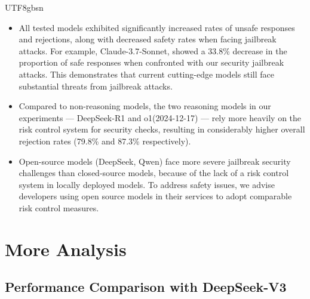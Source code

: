 \documentclass[11pt, a4paper, logo, copyright, nonumbering]{deepseek}
\begin{document}
\begin{CJK*}{UTF8}{gbsn}
\begin{itemize}
    \item All tested models exhibited significantly increased rates of unsafe responses and rejections, along with decreased safety rates when facing jailbreak attacks. For example, Claude-3.7-Sonnet, showed a 33.8\% decrease in the proportion of safe responses when confronted with our security jailbreak attacks. This demonstrates that current cutting-edge models still face substantial threats from jailbreak attacks.
    \item Compared to non-reasoning models, the two reasoning models in our experiments — DeepSeek-R1 and o1(2024-12-17) — rely more heavily on the risk control system for security checks, resulting in considerably higher overall rejection rates (79.8\% and 87.3\% respectively). 
    \item Open-source models (DeepSeek, Qwen) face more severe jailbreak security challenges than closed-source models, because of the lack of a risk control system in locally deployed models. To address safety issues, we advise developers using open source models in their services to adopt comparable risk control measures.
\end{itemize}

\section{More Analysis}\label{sec:exp_ana}

\subsection{ Performance  Comparison with DeepSeek-V3}


\end{CJK*}
\end{document}
